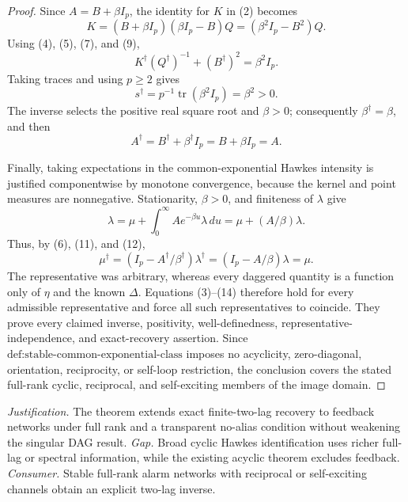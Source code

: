 \documentclass{article}
\begin{document}
\begin{proof}
Since \(A=B+\beta I_p\), the identity for \(K\) in (2) becomes
\[
 K=(B+\beta I_p)(\beta I_p-B)Q=(\beta^2I_p-B^2)Q.
\tag{9}
\]
Using (4), (5), (7), and (9),
\[
 K^\dagger(Q^\dagger)^{-1}+(B^\dagger)^2=\beta^2I_p.
\tag{10}
\]
Taking traces and using \(p\geq2\) gives
\[
 s^\dagger=p^{-1}\operatorname{tr}(\beta^2I_p)=\beta^2>0.
\tag{11}
\]
The inverse selects the positive real square root and \(\beta>0\); consequently \(\beta^\dagger=\beta\), and then
\[
 A^\dagger=B^\dagger+\beta^\dagger I_p=B+\beta I_p=A.
\tag{12}
\]

Finally, taking expectations in the common-exponential Hawkes intensity is justified componentwise by monotone convergence, because the kernel and point measures are nonnegative.  Stationarity, \(\beta>0\), and finiteness of \(\lambda\) give
\[
 \lambda=\mu+\int_0^\infty Ae^{-\beta u}\lambda\,du
 =\mu+(A/\beta)\lambda.
\tag{13}
\]
Thus, by (6), (11), and (12),
\[
 \mu^\dagger=(I_p-A^\dagger/\beta^\dagger)\lambda^\dagger
 =(I_p-A/\beta)\lambda=\mu.
\tag{14}
\]
The representative was arbitrary, whereas every daggered quantity is a function only of \(\eta\) and the known \(\Delta\).  Equations (3)--(14) therefore hold for every admissible representative and force all such representatives to coincide.  They prove every claimed inverse, positivity, well-definedness, representative-independence, and exact-recovery assertion.  Since \(\text{def:stable-common-exponential-class}\) imposes no acyclicity, zero-diagonal, orientation, reciprocity, or self-loop restriction, the conclusion covers the stated full-rank cyclic, reciprocal, and self-exciting members of the image domain.
\end{proof}
\par\smallskip\noindent \textit{Justification.} The theorem extends exact finite-two-lag recovery to feedback networks under full rank and a transparent no-alias condition without weakening the singular DAG result. \textit{Gap.} Broad cyclic Hawkes identification uses richer full-lag or spectral information, while the existing acyclic theorem excludes feedback. \textit{Consumer.} Stable full-rank alarm networks with reciprocal or self-exciting channels obtain an explicit two-lag inverse.
\end{document}
